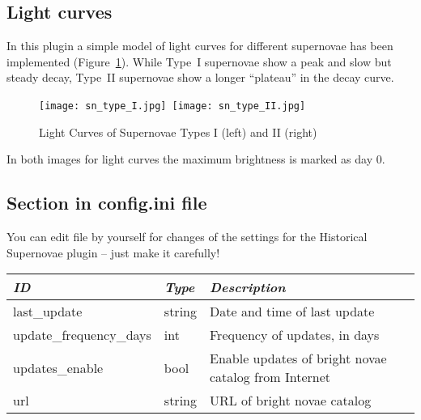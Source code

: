 \subsection{Light curves}
\label{sec:plugins:HistoricalSupernovae:lightcurves}

In this plugin a simple model of light curves for different supernovae
has been implemented (Figure~\ref{fig:SNTypeI+II}). 
While Type~I supernovae show a peak and slow but steady decay, Type~II supernovae show a longer ``plateau'' in the decay curve.


\begin{figure}[ht]
\begin{center}
\texttt{[image: sn\_type\_I.jpg]}\,
\texttt{[image: sn\_type\_II.jpg]}
\end{center}
\caption{Light Curves of Supernovae Types I (left) and II (right)}
\label{fig:SNTypeI+II}
\end{figure}



In both images for light curves the maximum brightness is marked as day 0.

\subsection{Section  in config.ini file}
\label{sec:plugins:HistoricalSupernovae:config}

You can edit  file by yourself for changes of the
settings for the Historical Supernovae plugin -- just make it carefully!

\noindent%
\begin{tabularx}{\textwidth}{l|l|X}\toprule
\emph{ID}            & \emph{Type} & \emph{Description}\\\midrule
last\_update            & string & Date and time of last update\\\midrule
update\_frequency\_days & int    & Frequency of updates, in days\\\midrule
updates\_enable         & bool   & Enable updates of bright novae catalog from Internet \\\midrule
url                     & string & URL of bright novae catalog \\\bottomrule
\end{tabularx}


